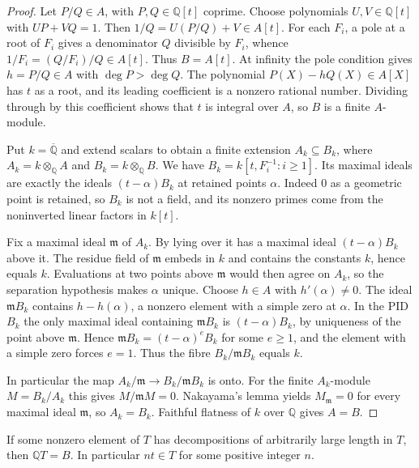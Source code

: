 \begin{proof}
    Let $P/Q \in A$, with $P, Q \in \mathbb{Q}[t]$ coprime.
    Choose polynomials $U, V \in \mathbb{Q}[t]$ with $UP + VQ = 1$.
    Then $1/Q = U(P/Q) + V \in A[t]$.
    For each $F_i$, a pole at a root of $F_i$ gives a denominator $Q$ divisible by $F_i$, whence $1/F_i = (Q/F_i)/Q \in A[t]$.
    Thus $B = A[t]$.
    At infinity the pole condition gives $h = P/Q \in A$ with $\deg{P} > \deg{Q}$.
    The polynomial $P(X) - hQ(X) \in A[X]$ has $t$ as a root, and its leading coefficient is a nonzero rational number.
    Dividing through by this coefficient shows that $t$ is integral over $A$, so $B$ is a finite $A$-module.

    Put $k = \overline{\mathbb{Q}}$ and extend scalars to obtain a finite extension $A_k \subseteq B_k$, where $A_k = k \otimes_{\mathbb{Q}} A$ and $B_k = k \otimes_{\mathbb{Q}} B$.
    We have $B_k = k[t, F_i^{-1} : i \ge 1]$.
    Its maximal ideals are exactly the ideals $(t - \alpha)B_k$ at retained points $\alpha$.
    Indeed $0$ as a geometric point is retained, so $B_k$ is not a field, and its nonzero primes come from the noninverted linear factors in $k[t]$.

    Fix a maximal ideal $\mathfrak{m}$ of $A_k$.
    By lying over it has a maximal ideal $(t - \alpha)B_k$ above it.
    The residue field of $\mathfrak{m}$ embeds in $k$ and contains the constants $k$, hence equals $k$.
    Evaluations at two points above $\mathfrak{m}$ would then agree on $A_k$, so the separation hypothesis makes $\alpha$ unique.
    Choose $h \in A$ with $h'(\alpha) \ne 0$.
    The ideal $\mathfrak{m}B_k$ contains $h - h(\alpha)$, a nonzero element with a simple zero at $\alpha$.
    In the PID $B_k$ the only maximal ideal containing $\mathfrak{m}B_k$ is $(t - \alpha)B_k$, by uniqueness of the point above $\mathfrak{m}$.
    Hence $\mathfrak{m}B_k = (t - \alpha)^e B_k$ for some $e \ge 1$, and the element with a simple zero forces $e = 1$.
    Thus the fibre $B_k/\mathfrak{m}B_k$ equals $k$.

    In particular the map $A_k/\mathfrak{m} \to B_k/\mathfrak{m}B_k$ is onto.
    For the finite $A_k$-module $M = B_k/A_k$ this gives $M/\mathfrak{m}M = 0$.
    Nakayama's lemma yields $M_{\mathfrak{m}} = 0$ for every maximal ideal $\mathfrak{m}$, so $A_k = B_k$.
    Faithful flatness of $k$ over $\mathbb{Q}$ gives $A = B$.
\end{proof}

\begin{proposition}
    \label{prop:generic}
    If some nonzero element of $T$ has decompositions of arbitrarily large length in $T$, then $\mathbb{Q}T = B$.
    In particular $nt \in T$ for some positive integer $n$.
\end{proposition}

